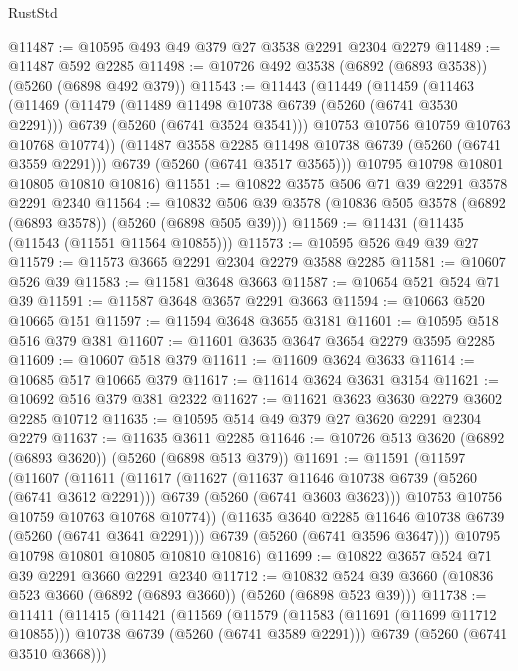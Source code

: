 \begin{lexlean}{RustStd}
\begin{coremodule}
@11487 := @10595 @493 @49 @379 @27 @3538 @2291 @2304 @2279
@11489 := @11487 @592 @2285
@11498 := @10726 @492 @3538 (@6892 (@6893 @3538)) (@5260 (@6898 @492 @379))
@11543 := @11443
    (@11449
      (@11459
        (@11463
          (@11469
            (@11479
              (@11489 @11498 @10738 @6739 (@5260 (@6741 @3530 @2291)))
              @6739
              (@5260 (@6741 @3524 @3541)))
            @10753
            @10756
            @10759
            @10763
            @10768
            @10774))
        (@11487 @3558 @2285 @11498 @10738 @6739 (@5260 (@6741 @3559 @2291)))
        @6739
        (@5260 (@6741 @3517 @3565)))
      @10795
      @10798
      @10801
      @10805
      @10810
      @10816)
@11551 := @10822 @3575 @506 @71 @39 @2291 @3578 @2291 @2340
@11564 := @10832 @506 @39 @3578 (@10836 @505 @3578 (@6892 (@6893 @3578)) (@5260 (@6898 @505 @39)))
@11569 := @11431 (@11435 (@11543 (@11551 @11564 @10855)))
@11573 := @10595 @526 @49 @39 @27
@11579 := @11573 @3665 @2291 @2304 @2279 @3588 @2285
@11581 := @10607 @526 @39
@11583 := @11581 @3648 @3663
@11587 := @10654 @521 @524 @71 @39
@11591 := @11587 @3648 @3657 @2291 @3663
@11594 := @10663 @520 @10665 @151
@11597 := @11594 @3648 @3655 @3181
@11601 := @10595 @518 @516 @379 @381
@11607 := @11601 @3635 @3647 @3654 @2279 @3595 @2285
@11609 := @10607 @518 @379
@11611 := @11609 @3624 @3633
@11614 := @10685 @517 @10665 @379
@11617 := @11614 @3624 @3631 @3154
@11621 := @10692 @516 @379 @381 @2322
@11627 := @11621 @3623 @3630 @2279 @3602 @2285 @10712
@11635 := @10595 @514 @49 @379 @27 @3620 @2291 @2304 @2279
@11637 := @11635 @3611 @2285
@11646 := @10726 @513 @3620 (@6892 (@6893 @3620)) (@5260 (@6898 @513 @379))
@11691 := @11591
    (@11597
      (@11607
        (@11611
          (@11617
            (@11627
              (@11637 @11646 @10738 @6739 (@5260 (@6741 @3612 @2291)))
              @6739
              (@5260 (@6741 @3603 @3623)))
            @10753
            @10756
            @10759
            @10763
            @10768
            @10774))
        (@11635 @3640 @2285 @11646 @10738 @6739 (@5260 (@6741 @3641 @2291)))
        @6739
        (@5260 (@6741 @3596 @3647)))
      @10795
      @10798
      @10801
      @10805
      @10810
      @10816)
@11699 := @10822 @3657 @524 @71 @39 @2291 @3660 @2291 @2340
@11712 := @10832 @524 @39 @3660 (@10836 @523 @3660 (@6892 (@6893 @3660)) (@5260 (@6898 @523 @39)))
@11738 := @11411
    (@11415
      (@11421
        (@11569
          (@11579 (@11583 (@11691 (@11699 @11712 @10855))) @10738 @6739 (@5260 (@6741 @3589 @2291)))
          @6739
          (@5260 (@6741 @3510 @3668)))

\end{coremodule}
\end{lexlean}
